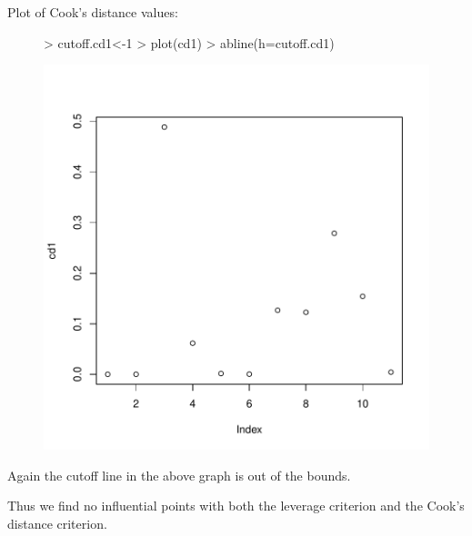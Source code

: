 \documentclass[12pt]{article}
\begin{document}
\begin{itemize}
Plot of Cook's distance values:
\begin{figure}[H]
\begin{Schunk}
\begin{Sinput}
> cutoff.cd1<-1
> plot(cd1)
> abline(h=cutoff.cd1)
\end{Sinput}
\end{Schunk}
\includegraphics{HW6-009}
\end{figure}
Again the cutoff line in the above graph is out of the bounds.

Thus we find no influential points with both the leverage criterion and the Cook's distance criterion.
\clearpage


\end{itemize}
\end{document}
